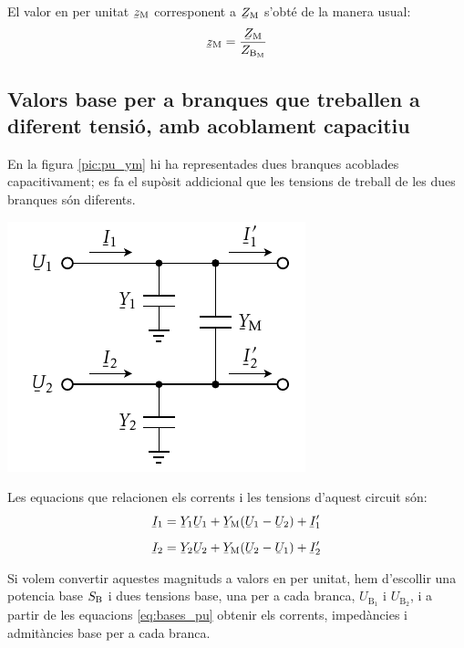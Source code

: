 El valor en per unitat $\cmplx{z}\ped{M}$ corresponent a $\cmplx{Z}\ped{M}$ s'obt\'{e} de la manera usual:
\begin{equation}
    \cmplx{z}\ped{M} = \frac{\cmplx{Z}\ped{M}}{Z_{\text{B}_\text{M}}}
\end{equation}


\subsection{Valors base per a branques que treballen a diferent tensi\'{o}, amb acoblament capacitiu}

En la figura \vref{pic:pu_ym} hi ha representades dues branques acoblades capacitivament; es fa el sup\`{o}sit addicional que les tensions de treball de les dues branques s\'{o}n diferents.

\begin{center}
    \includegraphics{Imatges/Cap-Fonaments-pu-YM.pdf}
    \label{pic:pu_ym}
\end{center}

Les equacions que relacionen els corrents i les tensions d'aquest circuit s\'{o}n:
\begin{subequations}
\begin{align}
    \cmplx{I}_1  &= \cmplx{Y}_1 \cmplx{U}_1 +  \cmplx{Y}\ped{M}(\cmplx{U}_1-\cmplx{U}_2)  + \cmplx{I}'_1   \\[2mm]
    \cmplx{I}_2  &= \cmplx{Y}_2 \cmplx{U}_2 +  \cmplx{Y}\ped{M}(\cmplx{U}_2-\cmplx{U}_1)  + \cmplx{I}'_2
\end{align}
\end{subequations}

Si volem convertir aquestes magnituds a valors en per unitat, hem d'escollir  una potencia base $S_\mathrm{B}$ i dues tensions base, una  per a cada branca, $U_{\text{B}_1}$ i  $U_{\text{B}_2}$, i a partir de les equacions \eqref{eq:bases_pu} obtenir els corrents, imped\`{a}ncies i admit\`{a}ncies base per a cada branca.

